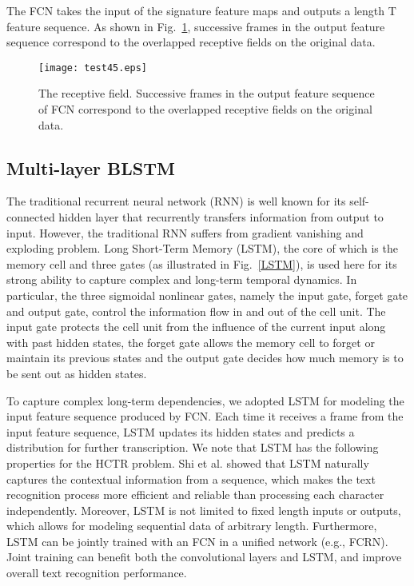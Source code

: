\documentclass[10pt,conference,a4paper]{IEEEtran}
\begin{document}
The FCN takes the input of the signature feature maps and outputs a length T feature sequence. As shown in Fig.~\ref{FigureTheReceptiveField}, successive frames in the output feature sequence correspond to the overlapped receptive fields on the original data.


\begin{figure}[t]
\centering
\texttt{[image: test45.eps]}
\caption{The receptive field. Successive frames in the output feature
sequence of FCN correspond to the overlapped receptive fields on the
original data.}
\label{FigureTheReceptiveField}
\end{figure}


\subsection{Multi-layer BLSTM}
The traditional recurrent neural network (RNN) is well known for its self-connected hidden layer that recurrently transfers information from output to input.
However, the traditional RNN suffers from gradient vanishing and exploding problem.
Long Short-Term Memory (LSTM)\cite{hochreiter1997long}, the core of which is the memory cell and three gates (as illustrated in Fig.~\ref{LSTM}), is used here for its strong ability to capture complex and long-term temporal dynamics.
In particular, the three sigmoidal nonlinear gates, namely the input gate, forget gate and output gate, control the information flow in and out of the cell unit.
The input gate protects the cell unit from the influence of the current input along with past hidden states,
the forget gate allows the memory cell to forget or maintain its previous states
and the output gate decides how much memory is to be sent out as hidden states.

To capture complex long-term dependencies, we adopted LSTM for modeling the input feature sequence produced by FCN.
Each time it receives a frame from the input feature sequence, LSTM updates its hidden states and predicts a distribution for further transcription. We note that LSTM has the following properties for the HCTR problem.
Shi et al.\cite{shi2015end} showed that LSTM naturally captures the contextual information from a sequence, which makes the text recognition process more efficient and reliable than processing each character independently.
Moreover, LSTM is not limited to fixed length inputs or outputs, which allows for modeling sequential data of arbitrary length.
Furthermore, LSTM can be jointly trained with an FCN in a unified network (e.g., FCRN).
Joint training can benefit both the convolutional layers and LSTM, and improve overall text recognition performance. %
\end{document}
